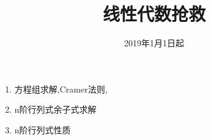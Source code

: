 \documentclass[11pt, a4paper, UTF8]{ctexart}
\title{线性代数抢救}
\date{2019年1月1日起}     %
\begin{document}
\maketitle
\beginthishw	%

\begin{problem}[行列式]	%
  \begin{enumerate}
    \item 方程组求解,Cramer法则,
    \item n阶行列式余子式求解
    \item n阶行列式性质
  \end{enumerate}
\end{problem}
\end{document}
